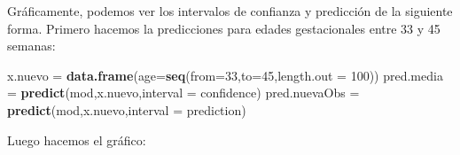 \documentclass[
]{article}
\newenvironment{Shaded}{\begin{snugshade}}{\end{snugshade}}
\newcommand{\AttributeTok}[1]{\textcolor[rgb]{0.13,0.29,0.53}{#1}}
\newcommand{\DecValTok}[1]{\textcolor[rgb]{0.00,0.00,0.81}{#1}}
\newcommand{\FunctionTok}[1]{\textcolor[rgb]{0.13,0.29,0.53}{\textbf{#1}}}
\newcommand{\NormalTok}[1]{#1}
\newcommand{\OtherTok}[1]{\textcolor[rgb]{0.56,0.35,0.01}{#1}}
\newcommand{\SpecialCharTok}[1]{\textcolor[rgb]{0.81,0.36,0.00}{\textbf{#1}}}
\newcommand{\StringTok}[1]{\textcolor[rgb]{0.31,0.60,0.02}{#1}}
\begin{document}
Gráficamente, podemos ver los intervalos de confianza y predicción de la siguiente forma. Primero hacemos la predicciones para edades gestacionales entre 33 y 45 semanas:

\begin{Shaded}
\begin{Highlighting}[]
\NormalTok{x.nuevo }\OtherTok{=} \FunctionTok{data.frame}\NormalTok{(}\AttributeTok{age=}\FunctionTok{seq}\NormalTok{(}\AttributeTok{from=}\DecValTok{33}\NormalTok{,}\AttributeTok{to=}\DecValTok{45}\NormalTok{,}\AttributeTok{length.out =} \DecValTok{100}\NormalTok{))}
\NormalTok{pred.media }\OtherTok{=} \FunctionTok{predict}\NormalTok{(mod,x.nuevo,}\AttributeTok{interval =} \StringTok{\textquotesingle{}confidence\textquotesingle{}}\NormalTok{)}
\NormalTok{pred.nuevaObs }\OtherTok{=} \FunctionTok{predict}\NormalTok{(mod,x.nuevo,}\AttributeTok{interval =} \StringTok{\textquotesingle{}prediction\textquotesingle{}}\NormalTok{)}
\end{Highlighting}
\end{Shaded}

Luego hacemos el gráfico:

\begin{Shaded}
\end{Shaded}
\end{document}
